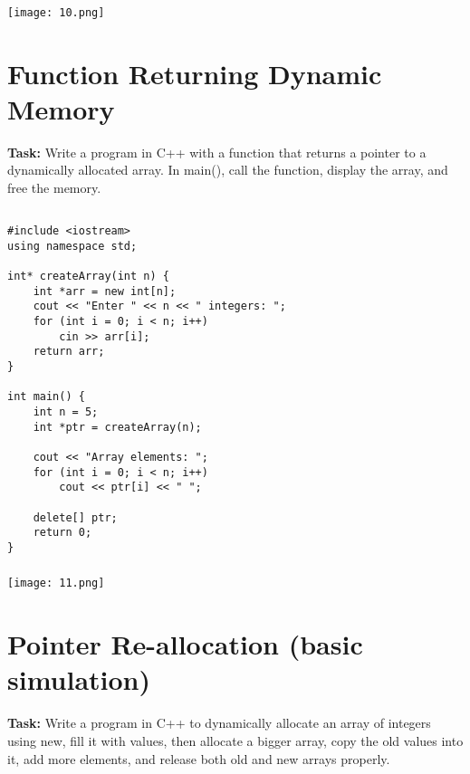 \documentclass[12pt,a4paper]{article}
\begin{document}
\subsubsection{}
\begin{center}
    \texttt{[image: 10.png]}
\end{center}


\section{Function Returning Dynamic Memory }
\textbf{Task:} Write a program in C++ with a function that returns a pointer to a dynamically allocated array. In main(), call the function, display the array, and free the memory.

\subsection{}
\begin{lstlisting}
#include <iostream>
using namespace std;

int* createArray(int n) {
    int *arr = new int[n];
    cout << "Enter " << n << " integers: ";
    for (int i = 0; i < n; i++)
        cin >> arr[i];
    return arr;
}

int main() {
    int n = 5;
    int *ptr = createArray(n);

    cout << "Array elements: ";
    for (int i = 0; i < n; i++)
        cout << ptr[i] << " ";

    delete[] ptr;
    return 0;
}

\end{lstlisting}

\subsubsection{}
\begin{center}
    \texttt{[image: 11.png]}
\end{center}


\section{Pointer Re-allocation (basic simulation) }
\textbf{Task:} Write a program in C++ to dynamically allocate an array of integers using new, fill it with values, then allocate a bigger array, copy the old values into it, add more elements, and release both old and new arrays properly.
\end{document}
